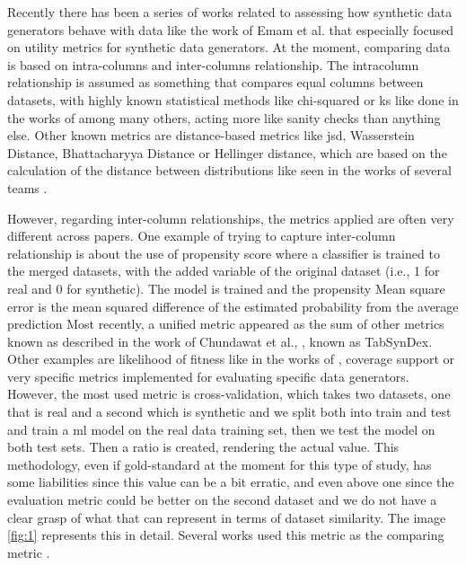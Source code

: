 
Recently there has been a series of works related to assessing how synthetic data generators behave with data like the work of Emam et al. \cite{emamUtilityMetricsEvaluating2022} that especially focused on utility metrics for synthetic data generators. At the moment, comparing data is based on intra-columns and inter-columns relationship. The intracolumn relationship is assumed as something that compares equal columns between datasets, with highly known statistical methods like chi-squared or \ac{ks} like done in the works of \cite{combrinkComparingSyntheticTabular2022} among many others, acting more like sanity checks than anything else. 
Other known metrics are distance-based metrics like \ac{jsd}, Wasserstein Distance, Bhattacharyya Distance or Hellinger distance, which are based on the calculation of the distance between distributions like seen in the works of several teams \cite{ISI:000557358500024,choiGeneratingMultilabelDiscrete2017,Baowaly2019}.

However, regarding inter-column relationships, the metrics applied are often very different across papers. One example of trying to capture inter-column relationship is about the use of propensity score \cite{rosenbaumCentralRolePropensity1983,mullerEvaluationSyntheticElectronic2022} where a classifier is trained to the merged datasets, with the added variable of the original dataset (i.e., 1 for real and 0 for synthetic). The model is trained and the propensity Mean square error is the  mean squared difference of the estimated probability from the average prediction
Most recently, a unified metric appeared as the sum of other metrics known as described in the work of Chundawat et al., \cite{chundawatTabSynDexUniversalMetric2022}, known as TabSynDex. Other examples are likelihood of fitness like in the works of \cite{xuModelingTabularData2019b}, coverage support \cite{goncalvesGenerationEvaluationSynthetic2020a} or very specific metrics implemented for evaluating specific data generators.
However, the most used metric is cross-validation, which takes two datasets, one that is real and a second which is synthetic and we split both into train and test and train a \ac{ml} model on the real data training set, then we test the model on both test sets. Then a ratio is created, rendering the actual value. This methodology, even if gold-standard at the moment for this type of study, has some liabilities since this value can be a bit erratic, and even above one since the evaluation metric could be better on the second dataset and we do not have a clear grasp of what that can represent in terms of dataset similarity. The image \ref{fig:1} represents this in detail. Several works used this metric as the comparing metric \cite{mullerEvaluationSyntheticElectronic2022}.

